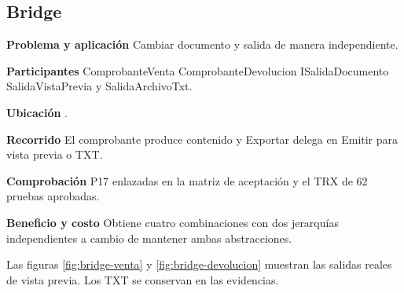 \noindent\begin{minipage}{\linewidth}
\subsection{Bridge}
\textbf{Problema y aplicación} Cambiar documento y salida de manera independiente.

\textbf{Participantes} ComprobanteVenta ComprobanteDevolucion ISalidaDocumento SalidaVistaPrevia y SalidaArchivoTxt.

\textbf{Ubicación} \href{https://github.com/Alan77-bot/LogiMarket360Alan/blob/68bda51063441415524ede51bdf61649ee9b4973/LogiMarket.Application/Comprobantes/Comprobante.cs#L6}{}.

\textbf{Recorrido} El comprobante produce contenido y Exportar delega en Emitir para vista previa o TXT.


\textbf{Comprobación} P17 enlazadas en la matriz de aceptación y el TRX de 62 pruebas aprobadas.

\textbf{Beneficio y costo} Obtiene cuatro combinaciones con dos jerarquías independientes a cambio de mantener ambas abstracciones.

Las figuras \ref{fig:bridge-venta} y \ref{fig:bridge-devolucion} muestran las salidas reales de vista previa. Los TXT se conservan en las evidencias.

\end{minipage}\par\smallskip
